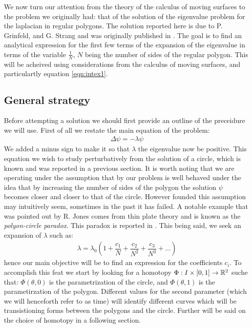 \documentclass[../main.tex]{subfiles}
\begin{document}
		We now turn our attention from the theory of the calculus of moving surfaces to the problem we originally had: that of the solution of the eigenvalue problem for the laplacian in regular polygons. The solution reported here is due to P. Grinfeld, and G. Strang and was originally published in \cite{grinfeld2012laplace}. The goal is to find an analytical expression for the first few terms of the expansion of the eigenvalue in terms of the variable $ \frac{1}{N} $, $ N $ being the number of sides of the regular polygon. This will be acheived using considerations from the calculus of moving surfaces, and particulartly equation \ref{eqn:intex1}.
		\subsection{General strategy}
		Before attempting a solution we should first provide an outline of the preceidure we will use. First of all we restate the main equation of the problem:
		\begin{gather}
			\label{eqn:lapleig}
			\Delta\psi=-\lambda\psi
		\end{gather}
		We added a minus sign to make it so that $ \lambda $ the eigenvalue now be positive. This equation we wish to study perturbatively from the solution of a circle, which is known and was reported in a previous section. It is worth noting that we are operating under the assumption that by our problem is well behaved under the idea that by increasing the number of sides of the polygon the solution $ \psi $ becomes closer and closer to that of the circle. However founded this assumption may intuitively seem, sometimes in the past it has failed. A notable example that was pointed out by R. Jones \cite{Jones2017} comes from thin plate theory and is known as the \emph{polyon-circle paradox}. This paradox is reported in \cite{murray1973polygon}. This being said, we seek an expansion of $ \lambda $ such as:
		\begin{gather}
			\lambda = \lambda_{0}\left(1+\dfrac{c_{1}}{N}+\dfrac{c_{2}}{N^{2}}+\dfrac{c_{3}}{N^{3}}+\dots\right)
		\end{gather}
		hence our main objective will be to find an expression for the coefficients $ c_{i} $. To accomplish this feat we start by looking for a homotopy $ \Phi:I\times\left[0,1\right]\to\mathbb{R}^{2} $ suche that: $ \Phi\left(\theta,0\right) $ is the parametrization of the circle, and $ \Phi\left(\theta,1\right) $ is the parametirzation of the polygon. Different values for the second parameter (which we will henceforth refer to as time) will identify different curves which will be transistioning forms between the polygons and the circle. Further will be said on the choice of homotopy in a following section.
		
\end{document}
